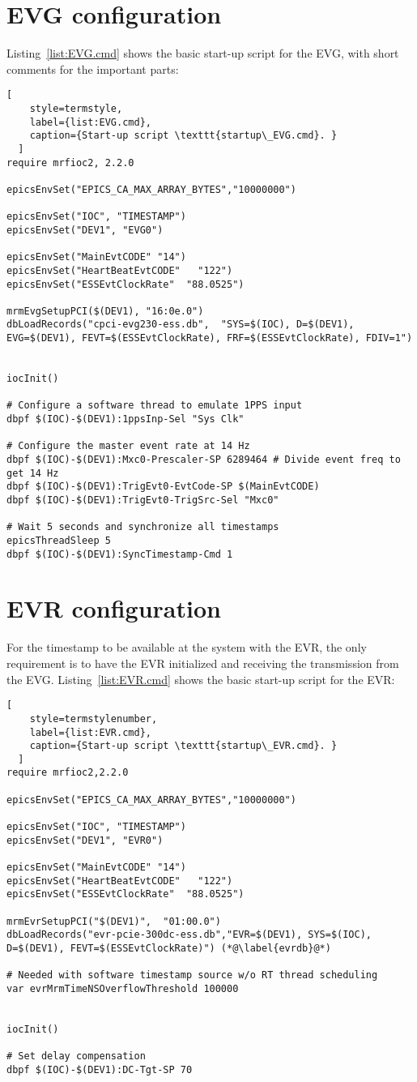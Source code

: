 \documentclass[11pt
  , a4paper
  , article
  , oneside
  , showtrims
]{memoir}
\begin{document}
\section{EVG configuration}
Listing~\ref{list:EVG.cmd} shows the basic start-up script for the EVG, with short comments for the important parts:
\begin{lstlisting}[
    style=termstyle,
    label={list:EVG.cmd},
    caption={Start-up script \texttt{startup\_EVG.cmd}. }
  ]
require mrfioc2, 2.2.0

epicsEnvSet("EPICS_CA_MAX_ARRAY_BYTES","10000000")

epicsEnvSet("IOC", "TIMESTAMP")
epicsEnvSet("DEV1", "EVG0")

epicsEnvSet("MainEvtCODE" "14")
epicsEnvSet("HeartBeatEvtCODE"   "122")
epicsEnvSet("ESSEvtClockRate"  "88.0525")

mrmEvgSetupPCI($(DEV1), "16:0e.0")
dbLoadRecords("cpci-evg230-ess.db",  "SYS=$(IOC), D=$(DEV1), EVG=$(DEV1), FEVT=$(ESSEvtClockRate), FRF=$(ESSEvtClockRate), FDIV=1")


iocInit()

# Configure a software thread to emulate 1PPS input
dbpf $(IOC)-$(DEV1):1ppsInp-Sel "Sys Clk"

# Configure the master event rate at 14 Hz
dbpf $(IOC)-$(DEV1):Mxc0-Prescaler-SP 6289464 # Divide event freq to get 14 Hz
dbpf $(IOC)-$(DEV1):TrigEvt0-EvtCode-SP $(MainEvtCODE)
dbpf $(IOC)-$(DEV1):TrigEvt0-TrigSrc-Sel "Mxc0"

# Wait 5 seconds and synchronize all timestamps
epicsThreadSleep 5
dbpf $(IOC)-$(DEV1):SyncTimestamp-Cmd 1

\end{lstlisting}

\section{EVR configuration}
For the timestamp to be available at the system with the EVR, the only requirement is to have the EVR initialized and receiving the transmission from the EVG. Listing~\ref{list:EVR.cmd} shows the basic start-up script for the EVR:
\begin{lstlisting}[
    style=termstylenumber,
    label={list:EVR.cmd},
    caption={Start-up script \texttt{startup\_EVR.cmd}. }
  ]
require mrfioc2,2.2.0

epicsEnvSet("EPICS_CA_MAX_ARRAY_BYTES","10000000")

epicsEnvSet("IOC", "TIMESTAMP")
epicsEnvSet("DEV1", "EVR0")

epicsEnvSet("MainEvtCODE" "14")
epicsEnvSet("HeartBeatEvtCODE"   "122")
epicsEnvSet("ESSEvtClockRate"  "88.0525")

mrmEvrSetupPCI("$(DEV1)",  "01:00.0")
dbLoadRecords("evr-pcie-300dc-ess.db","EVR=$(DEV1), SYS=$(IOC), D=$(DEV1), FEVT=$(ESSEvtClockRate)") (*@\label{evrdb}@*)

# Needed with software timestamp source w/o RT thread scheduling
var evrMrmTimeNSOverflowThreshold 100000


iocInit()

# Set delay compensation
dbpf $(IOC)-$(DEV1):DC-Tgt-SP 70
\end{lstlisting}
\end{document}

